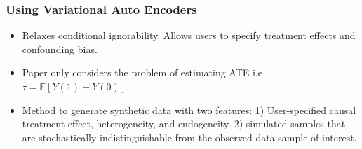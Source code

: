 \documentclass{beamer}
\begin{document}
\begin{frame}
	\frametitle{Using Variational Auto Encoders}
	\begin{itemize}
		\item Relaxes conditional ignorability. Allows users to specify treatment effects and confounding bias.
		\item Paper only considers the problem of estimating ATE i.e $ \tau = \mathbb{E}[Y(1) - Y(0)] $.
		\item Method to generate synthetic data with two features: 1) User-specified causal treatment effect, heterogeneity, and endogeneity. 2) simulated samples that are stochastically indistinguishable from the observed data sample of interest.
	\end{itemize}
\end{frame}
\end{document}
